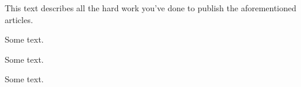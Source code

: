 This text describes all the hard work you've done to publish the aforementioned articles.

\begin{publikeenumerate}
\item Some text.
\item Some text.
\item Some text.
\end{publikeenumerate}
